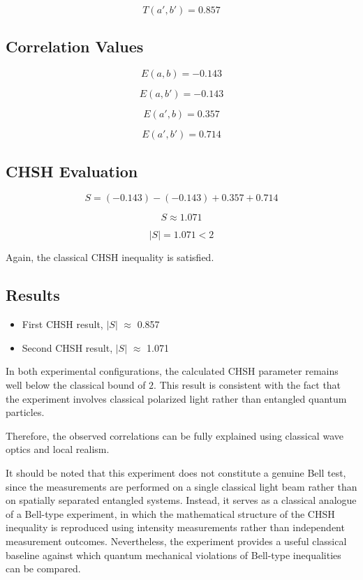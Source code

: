 \documentclass[14pt,a4paper]{extarticle}
\begin{document}
\[
T(a',b') = 0.857
\]

\subsection {Correlation Values}

\[
E(a,b) = -0.143
\]

\[
E(a,b') = -0.143
\]

\[
E(a',b) = 0.357
\]

\[
E(a',b') = 0.714
\]

\subsection {CHSH Evaluation}

\[
S = (-0.143) - (-0.143) + 0.357 + 0.714
\]

\[
S \approx 1.071
\]

\[
|S| = 1.071 < 2
\]

Again, the classical CHSH inequality is satisfied.

\subsection {Results}
\begin{itemize}
    \item First CHSH result, $|S|$ $\approx$ 0.857
    \item Second CHSH result, $|S|$ $\approx$ 1.071
\end{itemize}

In both experimental configurations, the calculated CHSH parameter remains well below the classical bound of $2$. This result is consistent with the fact that the experiment involves classical polarized light rather than entangled quantum particles.

Therefore, the observed correlations can be fully explained using classical wave optics and local realism.

It should be noted that this experiment does not constitute a genuine Bell test, since the measurements are performed on a single classical light beam rather than on spatially separated entangled systems. Instead, it serves as a classical analogue of a Bell-type experiment, in which the mathematical structure of the CHSH inequality is reproduced using intensity measurements rather than independent measurement outcomes. Nevertheless, the experiment provides a useful classical baseline against which quantum mechanical violations of Bell-type inequalities can be compared.
\end{document}
